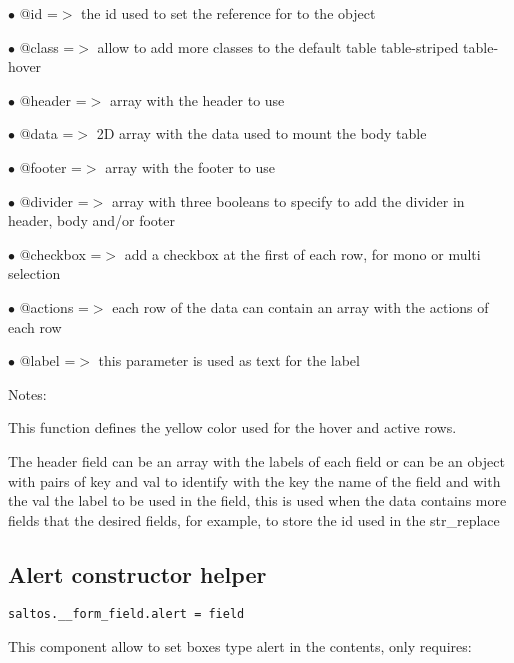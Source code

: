 \documentclass[a4paper]{book}
\begin{document}
\begin{compactitem}
\item[\color{myblue}$\bullet$] @id       =$>$ the id used to set the reference for to the object
\item[\color{myblue}$\bullet$] @class    =$>$ allow to add more classes to the default table table-striped table-hover
\item[\color{myblue}$\bullet$] @header   =$>$ array with the header to use
\item[\color{myblue}$\bullet$] @data     =$>$ 2D array with the data used to mount the body table
\item[\color{myblue}$\bullet$] @footer   =$>$ array with the footer to use
\item[\color{myblue}$\bullet$] @divider  =$>$ array with three booleans to specify to add the divider in header, body and/or footer
\item[\color{myblue}$\bullet$] @checkbox =$>$ add a checkbox at the first of each row, for mono or multi selection
\item[\color{myblue}$\bullet$] @actions  =$>$ each row of the data can contain an array with the actions of each row
\item[\color{myblue}$\bullet$] @label    =$>$ this parameter is used as text for the label
\end{compactitem}

Notes:

This function defines the yellow color used for the hover and active rows.

The header field can be an array with the labels of each field or can be an object
with pairs of key and val to identify with the key the name of the field and with the
val the label to be used in the field, this is used when the data contains more fields
that the desired fields, for example, to store the id used in the str\_replace

\hypertarget{toc399}{}
\subsection{Alert constructor helper}

\begin{lstlisting}
saltos.__form_field.alert = field
\end{lstlisting}

This component allow to set boxes type alert in the contents, only requires:
\end{document}
